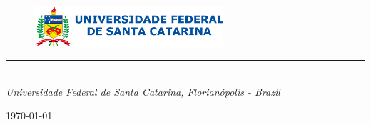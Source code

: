 %
%
%
%
%

\begin{titlepage}

\thispagestyle{empty}

\begin{flushleft}
\end{flushleft}

\vspace{1cm}

\begin{figure}[!ht]
    \begin{flushleft}
        \includegraphics[width=7cm]{figures/horizontal_fundo_claro.png}
    \end{flushleft}
\end{figure}

\begin{flushleft}
\Huge{\textbf{\thetitle}}
\rule[0pt]{\textwidth}{5pt}
\end{flushleft}

\vspace{0.2cm}

\begin{flushleft}
\textit{\thetitle} \\
\textit{Universidade Federal de Santa Catarina, Florianópolis - Brazil}
\end{flushleft}

\vfill
\vfill

\begin{flushright}
\monthyeardate\today
\end{flushright}

\end{titlepage}
